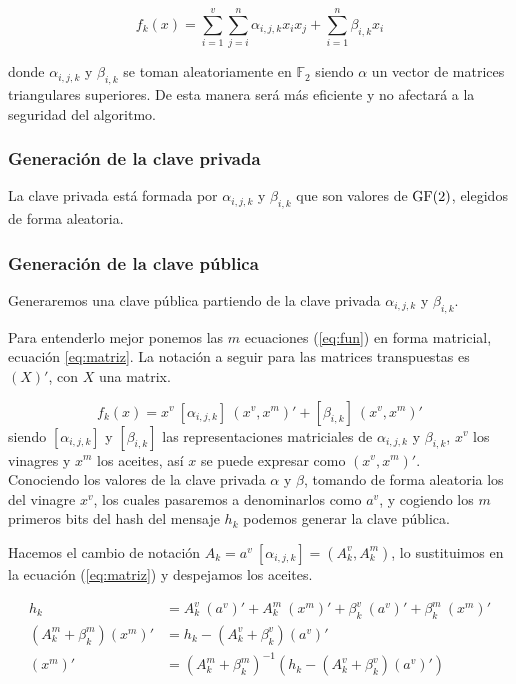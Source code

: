 \begin{equation}\label{eq:fun}
f_k(x) = \sum_{i=1}^v \sum_{j=i}^n \alpha_{i,j,k} x_i x_j + \sum_{i=1}^n \beta_{i,k} x_i
\end{equation}

donde $\alpha_{i,j,k}$ y $\beta_{i,k}$ se toman aleatoriamente en $\mathds{F}_2$ siendo $\alpha$ un vector de matrices triangulares superiores. De esta manera será más eficiente y no afectará a la seguridad del algoritmo.



\subsubsection{Generación de la clave privada}
La clave privada está formada por $\alpha_{i,j,k}$ y $\beta_{i,k}$ que son valores de $\operatorname{GF}(2)$, elegidos de forma aleatoria.


\subsubsection{Generación de la clave pública}
Generaremos una clave pública partiendo de la clave privada $\alpha_{i,j,k}$ y $\beta_{i,k}$.

Para entenderlo mejor ponemos las $m$ ecuaciones (\ref{eq:fun}) en forma matricial, ecuación \ref{eq:matriz}. La notación a seguir para las matrices transpuestas es $(X)'$, con $X$ una matrix.

\begin{equation}\label{eq:matriz} 
f_k(x) = x^v\ [\alpha_{i,j,k}]\ (x^v, x^m)' + [\beta_{i,k}]\ (x^v, x^m)'
\end{equation}
siendo $[\alpha_{i,j,k}]$ y $[\beta_{i,k}]$ las representaciones matriciales de $\alpha_{i,j,k}$ y $\beta_{i,k}$, $x^v$ los vinagres y $x^m$ los aceites, así $x$ se puede expresar como $(x^v, x^m)'$.\\

Conociendo los valores de la clave privada $\alpha$ y $\beta$, tomando de forma aleatoria los del vinagre $x^v$, los cuales pasaremos a denominarlos como $a^v$, y cogiendo los $m$ primeros bits del hash del mensaje $h_k$ podemos generar la clave pública.

Hacemos el cambio de notación $A_k = a^v\ [\alpha_{i,j,k}] = (A^v_k, A^m_k)$,  lo sustituimos en la ecuación (\ref{eq:matriz}) y despejamos los aceites.

\begin{align}
h_k &= A_k^v\ (a^v)' +  A_k^m\ (x^m)' + \beta_k^v\ (a^v)' + \beta_k^m\ (x^m)'\\
\label{eq:ter-coef}
(A_k^m + \beta_k^m) (x^m)' &= h_k - (A_k^v + \beta_k^v) (a^v)'\\
\label{eq:despeje}
(x^m)' &= (A_k^m + \beta_k^m)^{-1} (h_k - (A_k^v + \beta_k^v) (a^v)')
\end{align}

